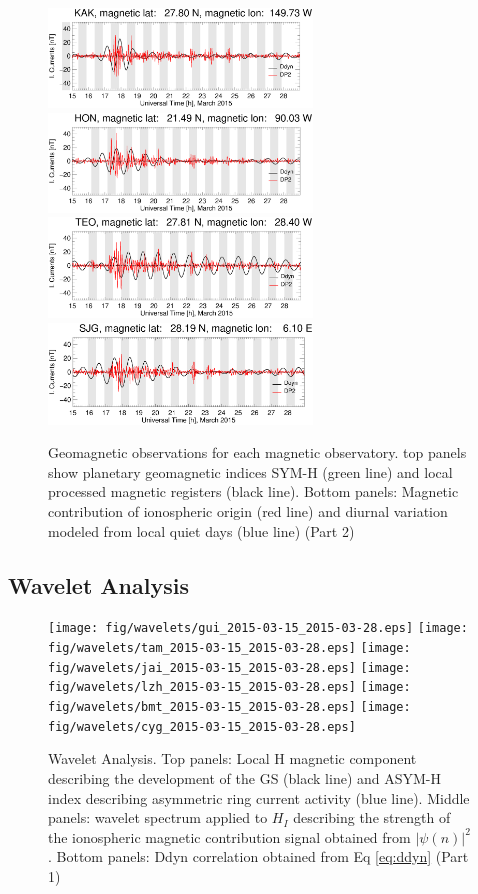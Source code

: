 \documentclass[a4paper]{article}
\theoremstyle{plain}
\theoremstyle{definition}
\begin{document}
\begin{figure}
	\includegraphics[width=7.0cm]{fig/diono_recons/kak_2015-03-15_2015-03-28.eps}
	\includegraphics[width=7.0cm]{fig/diono_recons/hon_2015-03-15_2015-03-28.eps}
	\includegraphics[width=7.0cm]{fig/diono_recons/teo_2015-03-15_2015-03-28.eps}
	\includegraphics[width=7.0cm]{fig/diono_recons/sjg_2015-03-15_2015-03-28.eps}
	\caption{Geomagnetic observations for each magnetic observatory. top panels show planetary geomagnetic indices SYM-H (green line) and local processed magnetic registers (black line). Bottom panels: Magnetic contribution of ionospheric origin (red line) and diurnal variation modeled from local quiet days (blue line) (Part 2)}
\end{figure}

	\subsection{Wavelet Analysis}
	
	

\begin{figure}
	\centering
	\texttt{[image: fig/wavelets/gui\_2015-03-15\_2015-03-28.eps]}   
	\texttt{[image: fig/wavelets/tam\_2015-03-15\_2015-03-28.eps]} 
	\texttt{[image: fig/wavelets/jai\_2015-03-15\_2015-03-28.eps]}  
	\texttt{[image: fig/wavelets/lzh\_2015-03-15\_2015-03-28.eps]}
	\texttt{[image: fig/wavelets/bmt\_2015-03-15\_2015-03-28.eps]}
	\texttt{[image: fig/wavelets/cyg\_2015-03-15\_2015-03-28.eps]}
	
	\caption{Wavelet Analysis. Top panels: Local H magnetic component describing the development of the GS (black line) and ASYM-H index describing asymmetric ring current activity (blue line). Middle panels: wavelet spectrum applied to $H_I$ describing the strength of the ionospheric magnetic contribution signal obtained from $|\psi(n)|^2$. Bottom panels: Ddyn correlation obtained from Eq \ref{eq:ddyn}  (Part 1)}
	\label{fig:wavelets}
\end{figure}
\end{document}

